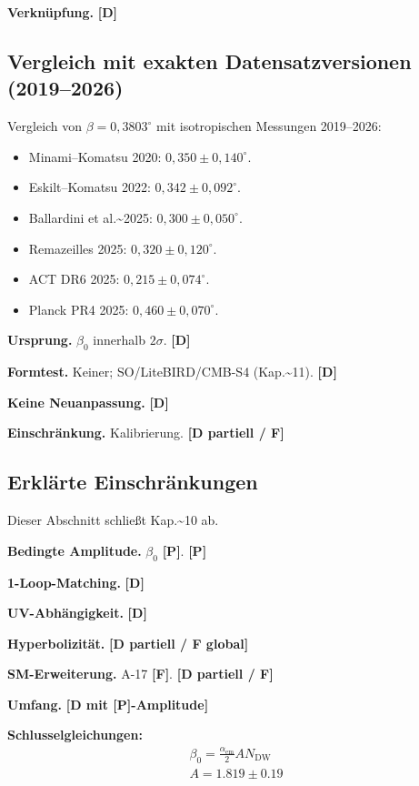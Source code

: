 ﻿\documentclass[11pt,letterpaper]{article}
\begin{document}
\textbf{Verknüpfung.} \textbf{[D]}
\subsection{Vergleich mit exakten Datensatzversionen (2019–2026)}
Vergleich von $\beta = 0{,}3803^\circ$ mit isotropischen Messungen 2019--2026:

\begin{itemize}[leftmargin=*]
\item Minami--Komatsu 2020: $0{,}350 \pm 0{,}140^\circ$.
\item Eskilt--Komatsu 2022: $0{,}342 \pm 0{,}092^\circ$.
\item Ballardini et al.\textasciitilde{}2025: $0{,}300 \pm 0{,}050^\circ$.
\item Remazeilles 2025: $0{,}320 \pm 0{,}120^\circ$.
\item ACT DR6 2025: $0{,}215 \pm 0{,}074^\circ$.
\item Planck PR4 2025: $0{,}460 \pm 0{,}070^\circ$.
\end{itemize}

\textbf{Ursprung.} $\beta_0$ innerhalb $2\sigma$. \textbf{[D]}

\textbf{Formtest.} Keiner; SO/LiteBIRD/CMB-S4 (Kap.\textasciitilde{}11). \textbf{[D]}

\textbf{Keine Neuanpassung.} \textbf{[D]}

\textbf{Einschränkung.} Kalibrierung. \textbf{[D partiell / F]}
\subsection{Erklärte Einschränkungen}
Dieser Abschnitt schließt Kap.\textasciitilde{}10 ab.

\textbf{Bedingte Amplitude.} $\beta_0$ \textbf{[P]}. \textbf{[P]}

\textbf{1-Loop-Matching.} \textbf{[D]}

\textbf{UV-Abhängigkeit.} \textbf{[D]}

\textbf{Hyperbolizität.} \textbf{[D partiell / F global]}

\textbf{SM-Erweiterung.} A-17 \textbf{[F]}. \textbf{[D partiell / F]}

\textbf{Umfang.} \textbf{[D mit [P]-Amplitude]}

\textbf{Schlusselgleichungen:}
\begin{align*}
    \beta_0 = \frac{\alpha_{\mathrm{em}}}{2} A N_{\mathrm{DW}} \\
    A = 1.819 \pm 0.19
\end{align*}
\end{document}
